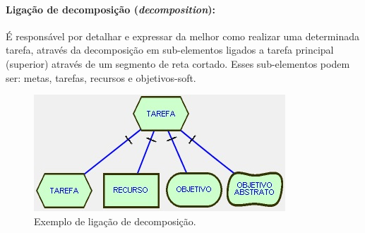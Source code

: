                 \paragraph{Ligação de decomposição (\emph{decomposition}):}
                    É responsável por detalhar e expressar da melhor como realizar uma determinada tarefa, através da decomposição em sub-elementos ligados  a  tarefa  principal (superior)  através  de  um  segmento  de  reta cortado.  Esses sub-elementos  podem  ser:  metas,  tarefas,  recursos  e  objetivos-soft.
                    \begin{figure}[h!]
                        \centering
                            \includegraphics[scale=1]{Figuras/istar/decomposition.jpg}
                            \caption{Exemplo de ligação de decomposição.}
                            \label{fig:decomposition}
                    \end{figure}
